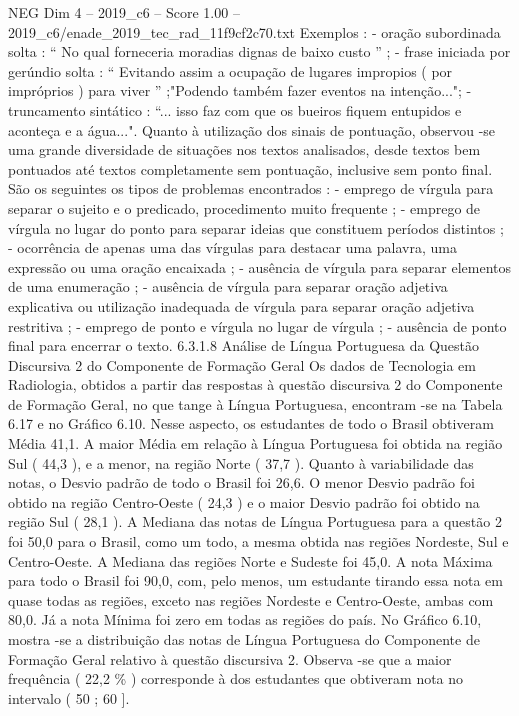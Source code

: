 \begin{textsample}{NEG Dim 4 – 2019\_c6 – Score 1.00 – 2019\_c6/enade\_2019\_tec\_rad\_11f9cf2c70.txt}
Exemplos : - oração subordinada solta : “ No qual forneceria moradias dignas de baixo custo ” ; - frase iniciada por gerúndio solta : “ Evitando assim a ocupação de lugares impropios ( por impróprios ) para viver ” ;"Podendo também fazer eventos na intenção..."; - truncamento sintático : “... isso faz com que os bueiros fiquem entupidos e aconteça e a água...".
Quanto à utilização dos sinais de pontuação, observou -se uma grande diversidade de situações nos textos analisados, desde textos bem pontuados até textos completamente sem pontuação, inclusive sem ponto final.
São os seguintes os tipos de problemas encontrados : - emprego de vírgula para separar o sujeito e o predicado, procedimento muito frequente ; - emprego de vírgula no lugar do ponto para separar ideias que constituem períodos distintos ; - ocorrência de apenas uma das vírgulas para destacar uma palavra, uma expressão ou uma oração encaixada ; - ausência de vírgula para separar elementos de uma enumeração ; - ausência de vírgula para separar oração adjetiva explicativa ou utilização inadequada de vírgula para separar oração adjetiva restritiva ; - emprego de ponto e vírgula no lugar de vírgula ; - ausência de ponto final para encerrar o texto. 6.3.1.8 Análise de Língua Portuguesa da Questão Discursiva 2 do Componente de Formação Geral Os dados de Tecnologia em Radiologia, obtidos a partir das respostas à questão discursiva 2 do Componente de Formação Geral, no que tange à Língua Portuguesa, encontram -se na Tabela 6.17 e no Gráfico 6.10.
Nesse aspecto, os estudantes de todo o Brasil obtiveram Média 41,1.
A maior Média em relação à Língua Portuguesa foi obtida na região Sul ( 44,3 ), e a menor, na região Norte ( 37,7 ).
Quanto à variabilidade das notas, o Desvio padrão de todo o Brasil foi 26,6.
O menor Desvio padrão foi obtido na região Centro-Oeste ( 24,3 ) e o maior Desvio padrão foi obtido na região Sul ( 28,1 ).
A Mediana das notas de Língua Portuguesa para a questão 2 foi 50,0 para o Brasil, como um todo, a mesma obtida nas regiões Nordeste, Sul e Centro-Oeste.
A Mediana das regiões Norte e Sudeste foi 45,0.
A nota Máxima para todo o Brasil foi 90,0, com, pelo menos, um estudante tirando essa nota em quase todas as regiões, exceto nas regiões Nordeste e Centro-Oeste, ambas com 80,0.
Já a nota Mínima foi zero em todas as regiões do país.
No Gráfico 6.10, mostra -se a distribuição das notas de Língua Portuguesa do Componente de Formação Geral relativo à questão discursiva 2.
Observa -se que a maior frequência ( 22,2 \% ) corresponde à dos estudantes que obtiveram nota no intervalo ( 50 ; 60 ].

\end{textsample}
